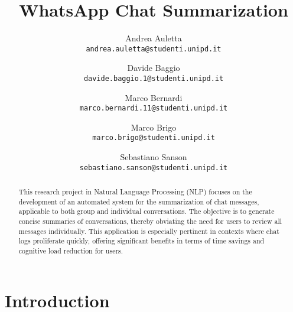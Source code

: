 \documentclass[10pt,twocolumn,letterpaper]{article}
\begin{document}
\title{WhatsApp Chat Summarization}

\author{Andrea Auletta\\
{\tt\small andrea.auletta@studenti.unipd.it}
\and
Davide Baggio\\
{\tt\small davide.baggio.1@studenti.unipd.it}
\and
Marco Bernardi\\
{\tt\small marco.bernardi.11@studenti.unipd.it}
\and
Marco Brigo\\
{\tt\small marco.brigo@studenti.unipd.it}
\and
Sebastiano Sanson\\
{\tt\small sebastiano.sanson@studenti.unipd.it}
}

\maketitle

\begin{abstract}This research project in Natural Language Processing (NLP) 
   focuses on the development of an automated system for the summarization 
   of chat messages, applicable to both group and individual conversations. The objective is to generate concise summaries of conversations, 
   thereby obviating the need for users to review all messages individually. 
   This application is especially pertinent in contexts where chat logs proliferate quickly, 
   offering significant benefits in terms of time savings and cognitive load reduction for users.
\end{abstract}

\section{Introduction}
\end{document}
